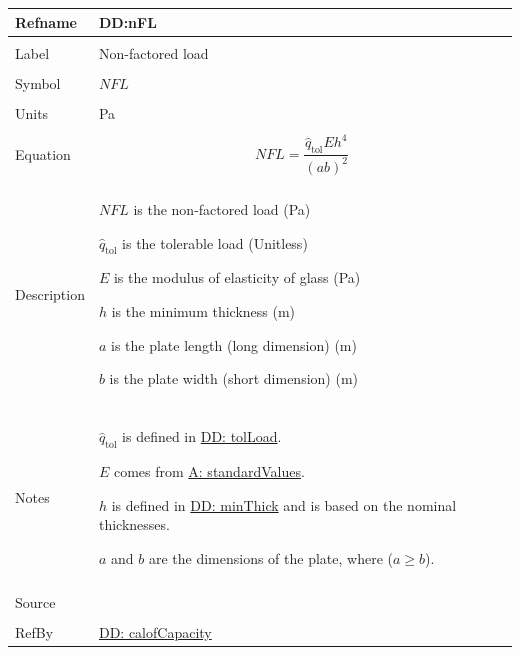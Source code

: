 \documentclass[12pt]{article}
\begin{document}
\begin{minipage}{\textwidth}
\begin{tabular}{>{\raggedright}p{}>{\raggedright\arraybackslash}p{}}
\toprule \textbf{Refname} & \textbf{DD:nFL}
\label{DD:nFL}
\\ \midrule \\
Label & Non-factored load
        
\\ \midrule \\
Symbol & $NFL$
         
\\ \midrule \\
Units & Pa
        
\\ \midrule \\
Equation & \begin{displaymath}
           NFL=\frac{{\hat{q}_{\text{tol}}} E h^{4}}{\left(a b\right)^{2}}
           \end{displaymath}
\\ \midrule \\
Description & \begin{symbDescription}
              \item{$NFL$ is the non-factored load (Pa)}
              \item{${\hat{q}_{\text{tol}}}$ is the tolerable load (Unitless)}
              \item{$E$ is the modulus of elasticity of glass (Pa)}
              \item{$h$ is the minimum thickness (m)}
              \item{$a$ is the plate length (long dimension) (m)}
              \item{$b$ is the plate width (short dimension) (m)}
              \end{symbDescription}
\\ \midrule \\
Notes & ${\hat{q}_{\text{tol}}}$ is defined in \hyperref[DD:tolLoad]{DD: tolLoad}.
        
        $E$ comes from \hyperref[assumpSV]{A: standardValues}.
        
        $h$ is defined in \hyperref[DD:minThick]{DD: minThick} and is based on the nominal thicknesses.
        
        $a$ and $b$ are the dimensions of the plate, where ($a\geq{}b$).
        
\\ \midrule \\
Source & \cite{astm2009}
         
\\ \midrule \\
RefBy & \hyperref[DD:calofCapacity]{DD: calofCapacity}
        
\\ \bottomrule
\end{tabular}
\end{minipage}
\end{document}
